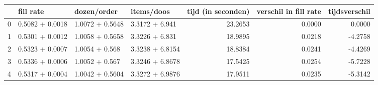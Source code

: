 \begin{tabular}{llllrrr}
\toprule
{} &        fill rate &      dozen/order &       items/doos &  tijd (in seconden) &  verschil in fill rate &  tijdsverschil \\
\midrule
0 &  0.5082 + 0.0018 &  1.0072 + 0.5648 &   3.3172 + 6.941 &             23.2653 &                 0.0000 &         0.0000 \\
1 &  0.5301 + 0.0012 &  1.0058 + 0.5658 &   3.3226 + 6.831 &             18.9895 &                 0.0218 &        -4.2758 \\
2 &  0.5323 + 0.0007 &   1.0054 + 0.568 &  3.3238 + 6.8154 &             18.8384 &                 0.0241 &        -4.4269 \\
3 &  0.5336 + 0.0006 &   1.0052 + 0.567 &  3.3246 + 6.8678 &             17.5425 &                 0.0254 &        -5.7228 \\
4 &  0.5317 + 0.0004 &  1.0042 + 0.5604 &  3.3272 + 6.9876 &             17.9511 &                 0.0235 &        -5.3142 \\
\bottomrule
\end{tabular}
